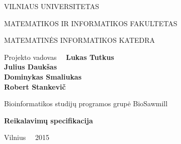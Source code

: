 \documentclass[a4paper,12pt]{article}
\begin{document}
\graphicspath{ {/} }

\renewcommand{\cftdot}{.}	
\renewcommand{\cftsecleader}{\cftdotfill{\cftdotsep}}

\thispagestyle{empty} %


\begin{center}
 VILNIAUS UNIVERSITETAS 
 
MATEMATIKOS IR INFORMATIKOS FAKULTETAS

MATEMATINĖS INFORMATIKOS KATEDRA

\vspace{4cm}

Projekto vadovas \ \ \textbf{Lukas Tutkus} \\
\textbf{Julius Daukšas} \\
\textbf{Dominykas Smaliukas} \\
\textbf{Robert Stankevič} \\

\vspace{0.2cm}

Bioinformatikos studijų programos grupė BioSawmill



\vspace{3cm}
\textbf{\Large Reikalavimų specifikacija}\\

\vfill

Vilnius \ \  2015
\end{center}



\clearpage

\tableofcontents
\clearpage
\end{document}
